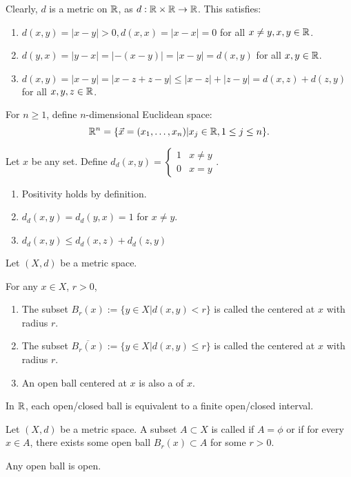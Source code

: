 \documentclass{book}
\begin{document}
Clearly, $d$ is a metric on $\mathbb{R}$, as $d : \mathbb{R} \times \mathbb{R} \to \mathbb{R}$. This satisfies:
\begin{enumerate}
    \item $d(x, y) = |x - y| > 0, d(x, x) = |x - x| = 0$ for all $x \neq y, x, y \in \mathbb{R}$.
    \item $d(y, x) = |y - x| = |-(x - y)| = |x - y| = d(x, y)$ for all $x, y \in \mathbb{R}$.
    \item $d(x, y) = |x - y| = |x - z + z - y| \leq |x - z| + |z - y| = d(x, z) + d(z, y)$ for all $x, y, z \in \mathbb{R}$.
\end{enumerate}

\begin{defn}
    For $n \geq 1$, define $n$-dimensional Euclidean space:
    \[\mathbb{R}^n = \{\vec x = (x_1, \ldots, x_n) | x_j \in \mathbb{R}, 1 \leq j \leq n \}.\] 
\end{defn}

\begin{ex}
    Let $x$ be any set. Define $d_d(x, y) = \begin{cases} 1 & x \neq y \\ 0 & x = y \end{cases}$.
\end{ex}
\begin{enumerate}
    \item Positivity holds by definition.
    \item $d_d (x, y) = d_d (y, x) = 1$ for $x \neq y$.
    \item $d_d (x, y) \leq d_d (x, z) + d_d (z, y)$
\end{enumerate}

\begin{defn}[balls]
    Let $(X, d)$ be a metric space.
    
    For any $x \in X$, $r > 0$,
    \begin{enumerate}
        \item The subset $B_r(x) := \{y \in X | d(x, y) < r\}$ is called the  centered at $x$ with radius $r$.
        \item The subset $\overline{B_r(x)} := \{y \in X | d(x, y) \leq r\}$ is called the  centered at $x$ with radius $r$.
        \item An open ball centered at $x$ is also a  of $x$.
    \end{enumerate}
\end{defn}

In $\mathbb{R}$, each open/closed ball is equivalent to a finite open/closed interval.

\begin{defn}[Openness]
    Let $(X, d)$ be a metric space. A subset $A \subset X$ is called  if $A = \phi$ or if for every $x \in A$, there exists some open ball $B_r(x) \subset A$ for some $r > 0$.
\end{defn}

\begin{thm}
    Any open ball is open.
\end{thm}
\end{document}
